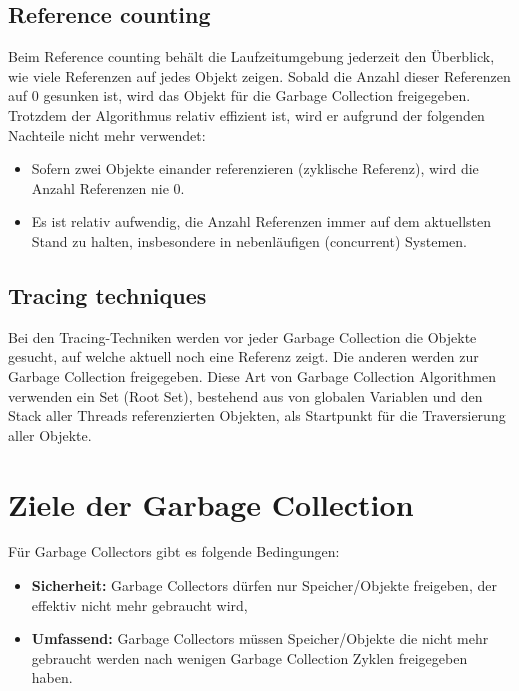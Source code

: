 \subsection{Reference counting}
Beim Reference counting\cite[S. 77]{lagergren2010oracle} behält die Laufzeitumgebung jederzeit den Überblick, wie viele Referenzen auf jedes Objekt zeigen. Sobald die Anzahl dieser Referenzen auf 0 gesunken ist, wird das Objekt für die Garbage Collection freigegeben. Trotzdem der Algorithmus relativ effizient ist, wird er aufgrund der folgenden Nachteile nicht mehr verwendet:
\begin{itemize}
	\item Sofern zwei Objekte einander referenzieren (zyklische Referenz), wird die Anzahl Referenzen nie 0.
	\item Es ist relativ aufwendig, die Anzahl Referenzen immer auf dem aktuellsten Stand zu halten, insbesondere in nebenläufigen (concurrent) Systemen.
\end{itemize}
\subsection{Tracing techniques}
Bei den Tracing-Techniken\cite[S. 77]{lagergren2010oracle} werden vor jeder Garbage Collection die Objekte gesucht, auf welche aktuell noch eine Referenz zeigt. Die anderen werden zur Garbage Collection freigegeben. Diese Art von Garbage Collection Algorithmen verwenden ein Set (Root Set), bestehend aus von globalen Variablen und den Stack aller Threads referenzierten Objekten, als Startpunkt für die Traversierung aller Objekte.

\section{Ziele der Garbage Collection}
Für Garbage Collectors gibt es folgende Bedingungen\cite[S. 4]{sunMemoryManagementWP}:
\begin{itemize}
	\item \textbf{Sicherheit:} Garbage Collectors dürfen nur Speicher/Objekte freigeben, der effektiv nicht mehr gebraucht wird,
	\item \textbf{Umfassend:} Garbage Collectors müssen Speicher/Objekte die nicht mehr gebraucht werden nach wenigen Garbage Collection Zyklen freigegeben haben.
\end{itemize}

